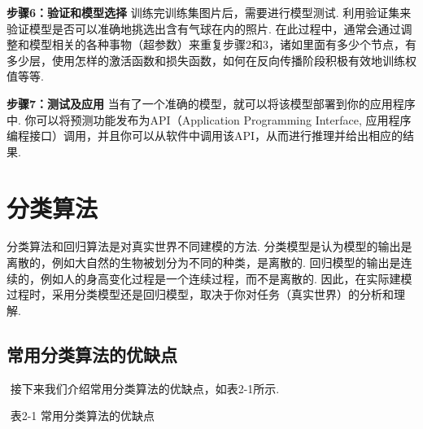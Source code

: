 \textbf{步骤6：验证和模型选择} ​
训练完训练集图片后，需要进行模型测试.
利用验证集来验证模型是否可以准确地挑选出含有气球在内的照片.
​
在此过程中，通常会通过调整和模型相关的各种事物（超参数）来重复步骤2和3，诸如里面有多少个节点，有多少层，使用怎样的激活函数和损失函数，如何在反向传播阶段积极有效地训练权值等等.

\textbf{步骤7：测试及应用} ​
当有了一个准确的模型，就可以将该模型部署到你的应用程序中.
你可以将预测功能发布为API（Application Programming Interface, 应用程序编程接口）调用，并且你可以从软件中调用该API，从而进行推理并给出相应的结果.

\section{ 分类算法}
\label{ux5206ux7c7bux7b97ux6cd5}
分类算法和回归算法是对真实世界不同建模的方法.
分类模型是认为模型的输出是离散的，例如大自然的生物被划分为不同的种类，是离散的.
回归模型的输出是连续的，例如人的身高变化过程是一个连续过程，而不是离散的.
因此，在实际建模过程时，采用分类模型还是回归模型，取决于你对任务（真实世界）的分析和理解.

\subsection{常用分类算法的优缺点}
\label{ux5e38ux7528ux5206ux7c7bux7b97ux6cd5ux7684ux4f18ux7f3aux70b9}

​ 接下来我们介绍常用分类算法的优缺点，如表2-1所示.

​ 表2-1 常用分类算法的优缺点


